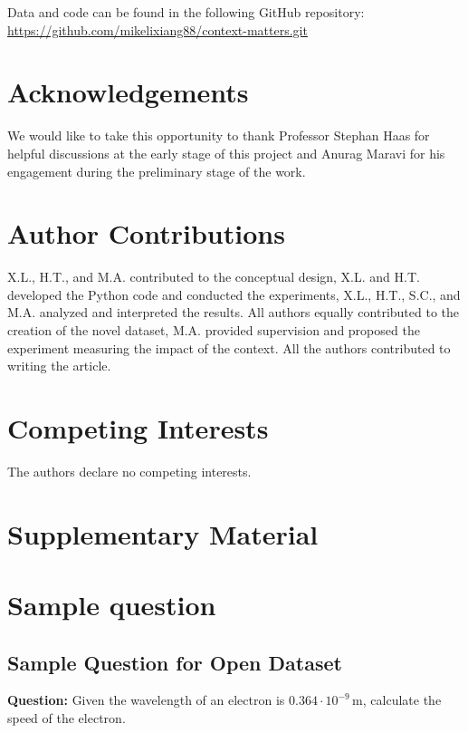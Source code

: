 \documentclass{article}
\begin{document}
    Data and code can be found in the following GitHub repository: \href{https://github.com/mikelixiang88/context-matters.git}{https://github.com/mikelixiang88/context-matters.git}


\section*{Acknowledgements}

    We would like to take this opportunity to thank Professor Stephan Haas for helpful discussions at the early stage of this project and Anurag Maravi for his engagement during the preliminary stage of the work.

\section*{Author Contributions}

    X.L., H.T., and M.A. contributed to the conceptual design,
    X.L. and H.T. developed the Python code and conducted the experiments,
    X.L., H.T., S.C., and M.A. analyzed and interpreted the results.
    All authors equally contributed to the creation of the novel dataset,
    M.A. provided supervision and proposed the experiment measuring the impact of the context.
    All the authors contributed to writing the article.
    
\section*{Competing Interests}

    The authors declare no competing interests.

\clearpage
\appendix

\section*{\Large Supplementary Material}

\section{Sample question}
\subsection{Sample Question for Open Dataset}
\textbf{Question:} Given the wavelength of an electron is \(0.364 \cdot 10^{-9} \, \text{m}\), calculate the speed of the electron.
\end{document}
